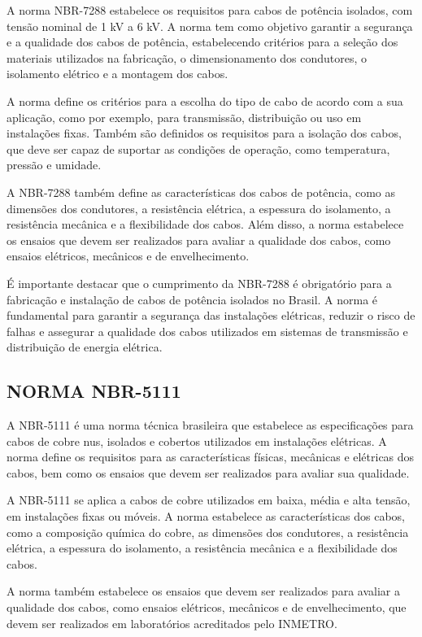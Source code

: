 A norma NBR-7288 estabelece os requisitos para cabos de potência isolados, com tensão nominal de 1 kV a 6 kV. A norma tem como objetivo garantir a segurança e a qualidade dos cabos de potência, estabelecendo critérios para a seleção dos materiais utilizados na fabricação, o dimensionamento dos condutores, o isolamento elétrico e a montagem dos cabos.

A norma define os critérios para a escolha do tipo de cabo de acordo com a sua aplicação, como por exemplo, para transmissão, distribuição ou uso em instalações fixas. Também são definidos os requisitos para a isolação dos cabos, que deve ser capaz de suportar as condições de operação, como temperatura, pressão e umidade.

A NBR-7288 também define as características dos cabos de potência, como as dimensões dos condutores, a resistência elétrica, a espessura do isolamento, a resistência mecânica e a flexibilidade dos cabos. Além disso, a norma estabelece os ensaios que devem ser realizados para avaliar a qualidade dos cabos, como ensaios elétricos, mecânicos e de envelhecimento.

É importante destacar que o cumprimento da NBR-7288 é obrigatório para a fabricação e instalação de cabos de potência isolados no Brasil. A norma é fundamental para garantir a segurança das instalações elétricas, reduzir o risco de falhas e assegurar a qualidade dos cabos utilizados em sistemas de transmissão e distribuição de energia elétrica.

\subsection{NORMA NBR-5111}

A NBR-5111 é uma norma técnica brasileira que estabelece as especificações para cabos de cobre nus, isolados e cobertos utilizados em instalações elétricas. A norma define os requisitos para as características físicas, mecânicas e elétricas dos cabos, bem como os ensaios que devem ser realizados para avaliar sua qualidade.

A NBR-5111 se aplica a cabos de cobre utilizados em baixa, média e alta tensão, em instalações fixas ou móveis. A norma estabelece as características dos cabos, como a composição química do cobre, as dimensões dos condutores, a resistência elétrica, a espessura do isolamento, a resistência mecânica e a flexibilidade dos cabos.

A norma também estabelece os ensaios que devem ser realizados para avaliar a qualidade dos cabos, como ensaios elétricos, mecânicos e de envelhecimento, que devem ser realizados em laboratórios acreditados pelo INMETRO.

